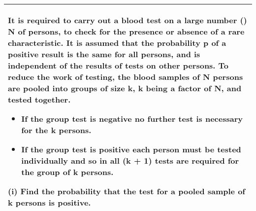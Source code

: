 \documentclass[a4paper,12pt]{article}
\begin{document}
\begin{table}[ht!]
     \centering
     \begin{tabular}{|p{15cm}|}
     \hline        
It is required to carry out a blood test on a large number () N of persons, to check for the presence or absence of a rare characteristic.  It is assumed that the probability p of a positive result is the same for all persons, and is independent of the results of tests on other persons.
To reduce the work of testing, the blood samples of N persons are pooled into groups of size k, k  being a factor of N,  and tested together. 

\begin{itemize}
    \item If the group test is negative no further test is necessary for the k persons.  
    \item If the group test is positive each person must be tested individually and so in all (k + 1) tests are required for the group of k persons.
\end{itemize}
(i) Find the probability that the test for a pooled sample of k persons is positive.

\\ \hline
      \end{tabular}
    \end{table}
    
\end{document}
